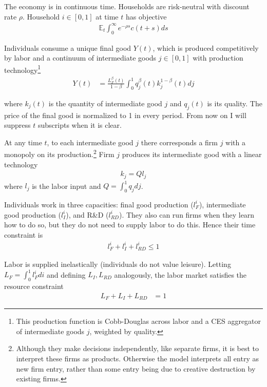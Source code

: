 \documentclass[11pt,english]{article}
\theoremstyle{remark}
\begin{document}
The economy is in continuous time. Households are risk-neutral with discount rate $\rho$. Household $i \in [0,1]$ at time $t$ has objective
\begin{align*}
 \mathbb{E}_t \int_0^{\infty} e^{-\rho s} c(t+s) ds
\end{align*}

Individuals consume a unique final good $Y(t)$, which is produced competitively by labor and a continuum of intermediate goods $j \in [0,1]$ with production technology\footnote{This production function is Cobb-Douglas across labor and a CES aggregator of intermediate goods $j$, weighted by quality. }
\begin{align*}
Y(t) &= \frac{L_F^{\beta}(t)}{1-\beta} \int_0^1 q_j^{\beta}(t) k_j^{1-\beta} (t) dj
\end{align*}

where $k_j(t)$ is the quantity of intermediate good $j$ and $q_j(t)$ is its quality. The price of the final good is normalized to 1 in every period. From now on I will suppress $t$ subscripts when it is clear. 

At any time $t$, to each intermediate good $j$ there corresponds a firm $j$ with a monopoly on its production.\footnote{Although they make decisions independently, like separate firms, it is best to interpret these firms as products. Otherwise the model interprets all entry as new firm entry, rather than some entry being due to creative destruction by existing firms.} Firm $j$ produces its intermediate good with a linear technology
\begin{align*}
k_j = Q l_j
\end{align*}
where $l_j$ is the labor input and $Q = \int_0^1 q_j dj$.

Individuals work in three capacities: final good production ($l_F^i$), intermediate good production ($l_I^i$), and R\&D ($l_{RD}^i$). They also can run firms when they learn how to do so, but they do not need to supply labor to do this. Hence their time constraint is
\begin{align*}
	l_F^i + l_I^i + l_{RD}^i \le 1
\end{align*}

Labor is supplied inelastically (individuals do not value leisure). Letting $L_F = \int_0^1 l_F^i di$ and defining $L_I,L_{RD}$ analogously, the labor market satisfies the resource constraint
\begin{align}
L_F + L_I + L_{RD} &= 1 \label{labor_resource_constraint}
\end{align}
\end{document}
